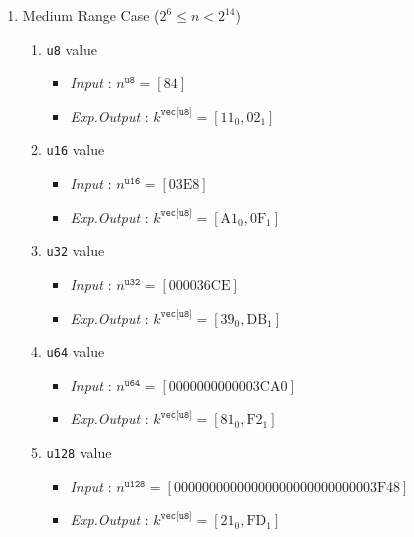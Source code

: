 \documentclass[../alan-handbook.tex]{subfiles}
\begin{document}
\begin{enumerate}
    \item Medium Range Case ($2^6 \leq n < 2^{14}$) 
        \begin{enumerate}
            \item \texttt{u8} value
                \begin{itemize}
                    \item \textit{Input} : $n^{\texttt{u8}} = [\text{84}]$
                    \item \textit{Exp.Output} : $k^{\texttt{vec[u8]}} = [\text{11}_0,\text{02}_1]$
                \end{itemize}
            \item \texttt{u16} value
                \begin{itemize}
                    \item \textit{Input} : $n^{\texttt{u16}} = [\text{03E8}]$
                    \item \textit{Exp.Output} : $k^{\texttt{vec[u8]}} = [\text{A1}_0,\text{0F}_1]$
                \end{itemize}
            \item \texttt{u32} value
                \begin{itemize}
                    \item \textit{Input} : $n^{\texttt{u32}} = [\text{000036CE}]$
                    \item \textit{Exp.Output} : $k^{\texttt{vec[u8]}} = [\text{39}_0,\text{DB}_1]$
                \end{itemize}
            \item \texttt{u64} value
                \begin{itemize}
                    \item \textit{Input} : $n^{\texttt{u64}} = [\text{0000000000003CA0}]$
                    \item \textit{Exp.Output} : $k^{\texttt{vec[u8]}} = [\text{81}_0,\text{F2}_1]$
                \end{itemize}
            \item \texttt{u128} value
                \begin{itemize}
                    \item \textit{Input} : $n^{\texttt{u128}} = [\text{00000000000000000000000000003F48}]$
                    \item \textit{Exp.Output} : $k^{\texttt{vec[u8]}} = [\text{21}_0,\text{FD}_1]$
                \end{itemize}
        \end{enumerate}
    

\end{enumerate}
\end{document}
